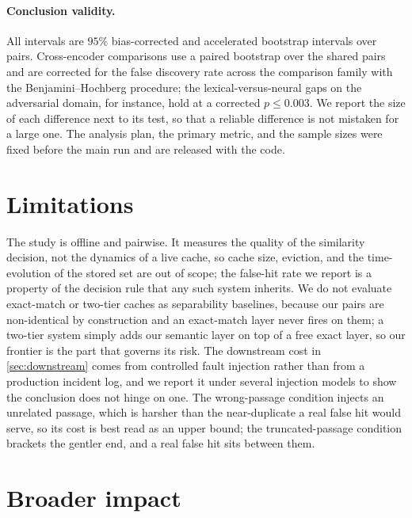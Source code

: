\paragraph{Conclusion validity.}
All intervals are $95\%$ bias-corrected and accelerated bootstrap intervals over pairs.
Cross-encoder comparisons use a paired bootstrap over the shared pairs and are corrected for
the false discovery rate across the comparison family with the Benjamini--Hochberg procedure;
the lexical-versus-neural gaps on the adversarial domain, for instance, hold at a corrected
$p \le 0.003$. We report the size of each difference next to its test, so that a reliable
difference is not mistaken for a large one. The analysis plan, the primary metric, and the
sample sizes were fixed before the main run and are released with the code.

\section{Limitations}
\label{sec:limitations}

The study is offline and pairwise. It measures the quality of the similarity decision, not
the dynamics of a live cache, so cache size, eviction, and the time-evolution of the stored
set are out of scope; the false-hit rate we report is a property of the decision rule that
any such system inherits. We do not evaluate exact-match or two-tier caches as separability
baselines, because our pairs are non-identical by construction and an exact-match layer
never fires on them; a two-tier system simply adds our semantic layer on top of a free exact
layer, so our frontier is the part that governs its risk. The downstream cost in
\cref{sec:downstream} comes from controlled fault injection rather than from a production
incident log, and we report it under several injection models to show the conclusion does
not hinge on one. The wrong-passage condition injects an unrelated passage, which is harsher
than the near-duplicate a real false hit would serve, so its cost is best read as an upper
bound; the truncated-passage condition brackets the gentler end, and a real false hit sits
between them.

\section{Broader impact}
\label{sec:impact}

